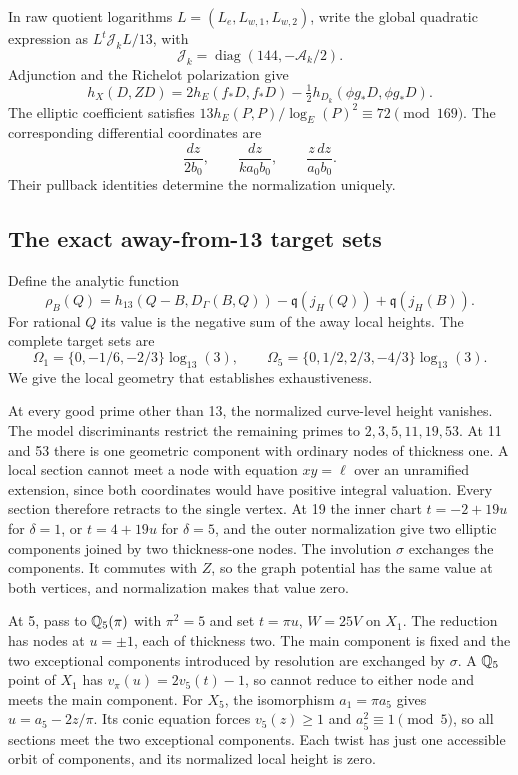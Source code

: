 In raw quotient logarithms $L=(L_e,L_{w,1},L_{w,2})$, write the
global quadratic expression as $L^t\mathcal J_kL/13$, with
\[
 \mathcal J_k=\operatorname{diag}(144,-\mathcal A_k/2).
\]
Adjunction and the Richelot polarization give
\[
 h_X(D,ZD)=2h_E(f_*D,f_*D)
                    -\tfrac12h_{D_k}(\phi g_*D,\phi g_*D).
\]
The elliptic coefficient satisfies
$13h_E(P,P)/\log_E(P)^2\equiv72\pmod{169}$.
The corresponding differential coordinates are
\[
 \frac{dz}{2b_0},\qquad \frac{dz}{ka_0b_0},\qquad
                              \frac{z\,dz}{a_0b_0}.
\]
Their pullback identities determine the normalization uniquely.

\subsection{The exact away-from-13 target sets}

Define the analytic function
\begin{equation}\label{eq:t10-rho}
 \rho_B(Q)=h_{13}(Q-B,D_\Gamma(B,Q))
               -\mathfrak q(j_H(Q))+\mathfrak q(j_H(B)).
\end{equation}
For rational $Q$ its value is the negative sum of the away local
heights. The complete target sets are
\begin{equation}\label{eq:t10-targets}
 \Omega_1=\{0,-1/6,-2/3\}\log_{13}(3),\qquad
 \Omega_5=\{0,1/2,2/3,-4/3\}\log_{13}(3).
\end{equation}
We give the local geometry that establishes exhaustiveness.

At every good prime other than 13, the normalized curve-level height
vanishes. The model discriminants restrict the remaining primes to
$2,3,5,11,19,53$. At 11 and 53 there is one geometric component with
ordinary nodes of thickness one. A local section cannot meet a node
with equation $xy=\ell$ over an unramified extension, since both
coordinates would have positive integral valuation. Every section
therefore retracts to the single vertex. At 19 the inner chart
$t=-2+19u$ for $\delta=1$, or $t=4+19u$ for $\delta=5$, and the
outer normalization give two elliptic components joined by two
thickness-one nodes. The involution $\sigma$ exchanges the components.
It commutes with $Z$, so the graph potential has the same value at
both vertices, and normalization makes that value zero.

At 5, pass to $\mathbb Q_5(\pi)$ with $\pi^2=5$ and set
$t=\pi u$, $W=25V$ on $X_1$. The reduction has nodes at $u=\pm1$,
each of thickness two. The main component is fixed and the two
exceptional components introduced by resolution are exchanged by
$\sigma$. A $\mathbb Q_5$ point of $X_1$ has
$v_\pi(u)=2v_5(t)-1$, so cannot reduce to either node and meets the
main component. For $X_5$, the isomorphism $a_1=\pi a_5$ gives
$u=a_5-2z/\pi$. Its conic equation forces $v_5(z)\geq1$ and
$a_5^2\equiv1\pmod5$, so all sections meet the two exceptional
components. Each twist has just one accessible orbit of components,
and its normalized local height is zero.

